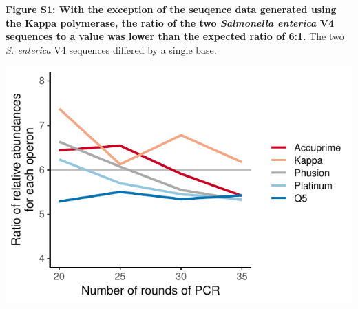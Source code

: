 \documentclass[11pt,]{article}
\begin{document}
\newpage

\textbf{Figure S1: With the exception of the seuqence data generated
using the Kappa polymerase, the ratio of the two \emph{Salmonella
enterica} V4 sequences to a value was lower than the expected ratio of
6:1.} The two \emph{S. enterica} V4 sequences differed by a single base.

\includegraphics[width=1.0\columnwidth]{../results/figures/salmonella_bias.pdf}
\end{document}

